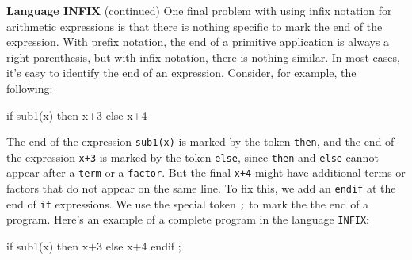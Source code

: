 \begin{minipage}[t]{\sw}
\slidenumber
\LARGE
{\bf Language INFIX} (continued)\exx
One final problem with using infix notation for arithmetic expressions
is that there is nothing specific to mark the end of the expression.
With prefix notation, the end of a primitive application is always
a right parenthesis,
but with infix notation, there is nothing similar.
In most cases, it's easy to identify the end of an expression.
Consider, for example, the following:
\begin{qv}
if sub1(x) then x+3 else x+4
\end{qv}
The end of the expression \verb'sub1(x)'
is marked by the token \verb'then',
and the end of the expression \verb'x+3'
is marked by the token  \verb'else',
since \verb'then' and \verb'else' cannot appear
after a \verb'term' or a \verb'factor'.
But the final \verb'x+4' might have additional terms or factors
that do not appear on the same line.
To fix this, we add an \verb'endif' at the end of \verb'if'
expressions.\exx
We use the special token \verb';' to mark the the end of a program.
Here's an example of a complete program in the language \verb'INFIX':
\begin{qv}
if sub1(x) then x+3 else x+4 endif ;
\end{qv}
\end{minipage}

